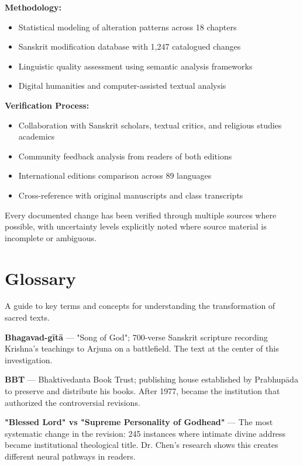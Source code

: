 \documentclass[11pt,twoside]{book}
\begin{document}
\textbf{\textbf{Methodology:}}
\begin{itemize}
\item Statistical modeling of alteration patterns across 18 chapters
\item Sanskrit modification database with 1,247 catalogued changes
\item Linguistic quality assessment using semantic analysis frameworks
\item Digital humanities and computer-assisted textual analysis
\end{itemize}

\textbf{\textbf{Verification Process:}}
\begin{itemize}
\item Collaboration with Sanskrit scholars, textual critics, and religious studies academics
\item Community feedback analysis from readers of both editions
\item International editions comparison across 89 languages
\item Cross-reference with original manuscripts and class transcripts
\end{itemize}

Every documented change has been verified through multiple sources where possible, with uncertainty levels explicitly noted where source material is incomplete or ambiguous.
\part*{Glossary}
\label{sec:org869a01c}
\thispagestyle{plain}

A guide to key terms and concepts for understanding the transformation of sacred texts.

\textbf{\textbf{Bhagavad-gītā}} — "Song of God"; 700-verse Sanskrit scripture recording Krishna's teachings to Arjuna on a battlefield. The text at the center of this investigation.

\textbf{\textbf{BBT}} — Bhaktivedanta Book Trust; publishing house established by Prabhupāda to preserve and distribute his books. After 1977, became the institution that authorized the controversial revisions.

\textbf{\textbf{"Blessed Lord" vs "Supreme Personality of Godhead"}} — The most systematic change in the revision: 245 instances where intimate divine address became institutional theological title. Dr. Chen's research shows this creates different neural pathways in readers.
\end{document}
